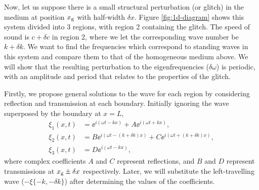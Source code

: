 Now, let us suppose there is a small structural perturbation (or glitch) in the medium at position \(x_{{\mathrm{g}}}\) with half-width \(\delta x\). Figure \ref{fig:1d-diagram} shows this system divided into 3 regions, with region 2 containing the glitch. The speed of sound is \(c + \delta c\) in region 2, where we let the corresponding wave number be \(k + \delta k\). We want to find the frequencies which correspond to standing waves in this system and compare them to that of the homogeneous medium above. We will show that the resulting perturbation to the eigenfrequencies (\(\delta\omega\)) is periodic, with an amplitude and period that relates to the properties of the glitch.

Firstly, we propose general solutions to the wave for each region by considering reflection and transmission at each boundary. Initially ignoring the wave superposed by the boundary at \(x=L\),
%
\begin{align}
    \xi_1(x, t) &= \ee^{i(\omega t - k x)} + A \ee^{i(\omega t + k x)}, \label{eq:xi1-r} \\
    \xi_2(x, t) &= B\ee^{i(\omega t - (k + \delta k) x)} + C \ee^{i(\omega t + (k + \delta k) x)}, \label{eq:xi2-r} \\
    \xi_3(x, t) &= D \ee^{i(\omega t - k x)}, \label{eq:xi3-r}
\end{align}
%
where complex coefficients \(A\) and \(C\) represent reflections, and \(B\) and \(D\) represent transmissions at \(x_{{\mathrm{g}}} \pm \delta x\) respectively. Later, we will substitute the left-travelling wave (\(- \xi\{-k, -\delta k\}\)) after determining the values of the coefficients.

